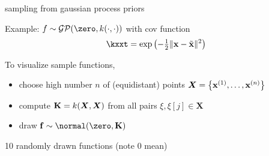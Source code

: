 \documentclass[11pt,compress,t,notes=noshow, xcolor=table]{beamer}
\begin{document}
\begin{framei}[sep=L]{sampling from gaussian process priors}
\item Example: $f \sim \GPzk$ with cov function
$$ \kxxt = \exp\left(-\tfrac{1}{2}\xxtnorm^2\right)$$
\item To visualize sample functions, 
\begin{itemize}
\item choose high number $n$ of (equidistant) points $\bm{X} = \left\{ \mathbf{x}^{(1)}, \ldots, \mathbf{x}^{(n)}\right\}$
  \item compute $\mathbf{K} = k(\bm{X}, \bm{X})$ from all pairs $\xi, \xi[j] \in \bm{X}$ 
  \item draw $\fv \sim \Nzk$ 
\end{itemize}
\item 10 randomly drawn functions (note 0 mean)
\vfill
{}
\end{framei}

\endlecture
\end{document}
